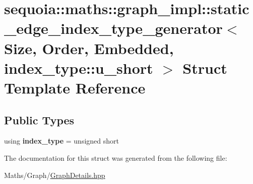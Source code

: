 \hypertarget{structsequoia_1_1maths_1_1graph__impl_1_1static__edge__index__type__generator_3_01_size_00_01_orea7018a766e80958c32f72dd7544f1f3}{}\section{sequoia\+::maths\+::graph\+\_\+impl\+::static\+\_\+edge\+\_\+index\+\_\+type\+\_\+generator$<$ Size, Order, Embedded, index\+\_\+type\+::u\+\_\+short $>$ Struct Template Reference}
\label{structsequoia_1_1maths_1_1graph__impl_1_1static__edge__index__type__generator_3_01_size_00_01_orea7018a766e80958c32f72dd7544f1f3}
\subsection*{Public Types}
\begin{DoxyCompactItemize}
\item 
\mbox{\label{structsequoia_1_1maths_1_1graph__impl_1_1static__edge__index__type__generator_3_01_size_00_01_orea7018a766e80958c32f72dd7544f1f3_aa19c96ee472dd6de96a033a29778b87a}} 
using {\bfseries index\+\_\+type} = unsigned short
\end{DoxyCompactItemize}


The documentation for this struct was generated from the following file\+:\begin{DoxyCompactItemize}
\item 
Maths/\+Graph/\mbox{\hyperlink{_graph_details_8hpp}{Graph\+Details.\+hpp}}\end{DoxyCompactItemize}
